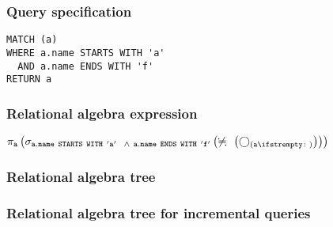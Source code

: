 \subsubsection*{Query specification}

\begin{lstlisting}
MATCH (a)
WHERE a.name STARTS WITH 'a'
  AND a.name ENDS WITH 'f'
RETURN a
\end{lstlisting}

\subsubsection*{Relational algebra expression}

$\projection{\var{a}} \left(\selection{\mathtt{a.name~STARTS~WITH~'a'
~~\land~a.name~ENDS~WITH~'f'}} \left(\alldifferent{} \left(\getvertices{a}{}\right)\right)\right)$

\subsubsection*{Relational algebra tree}


\subsubsection*{Relational algebra tree for incremental queries}


